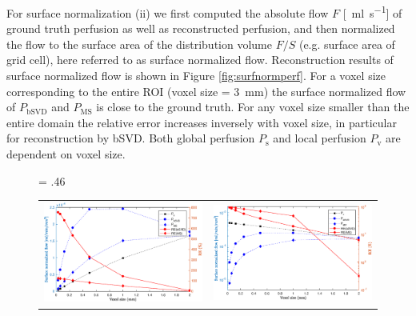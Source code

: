 \documentclass[final,5p,times,twocolumn]{elsarticle}
\begin{document}
For surface normalization (ii) we first computed the absolute flow $F$ [\SI{}{\milli\litre\per\second}] of ground truth perfusion as well as reconstructed perfusion, and then normalized the flow to the surface area of the distribution volume $F/S$ (e.g. surface area of grid cell), here referred to as surface normalized flow. 
Reconstruction results of surface normalized flow is shown in Figure \ref{fig:surfnormperf}. For a voxel size corresponding to the entire ROI (voxel size = \SI{3}{\milli\meter}) the surface normalized flow of $P_{\mathrm{bSVD}}$ and $P_{\mathrm{MS}}$ is close to the ground truth. For any voxel size smaller than the entire domain the relative error increases inversely with voxel size, in particular for reconstruction by bSVD. Both global perfusion $P_{\mathrm{s}}$ and local perfusion $P_{\mathrm{v}}$ are dependent on voxel size.
    \begin{figure}[!htb]
    	\centering
    	\fwd = .46\textwidth
    	\begin{tabular}{c c}
    		\includegraphics[width=\fwd]{figs/E110_CBFOnDifferentResolutions_plot-Ps-scaleto-S.eps} & \includegraphics[width=\fwd]{figs/E110_CBFOnDifferentResolutions_plot-Pv-scaleto-S.eps}\\	

\end{tabular}
\end{figure}
\end{document}
